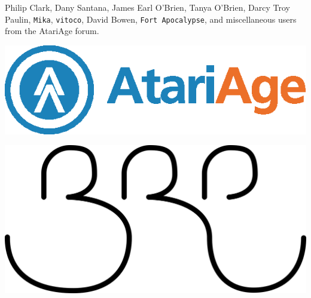 \documentclass[9pt,twocolumn,openany,article]{memoir}
\newcommand\englishskip{\vspace{14pt}}
\begin{document}
{ \footnotesize  Philip Clark, Dany  Santana, James Earl  O'Brien, Tanya
  O'Brien,  Darcy  Troy  Paulin, \texttt{Mika},  \texttt{vitoco},  David
  Bowen,  \texttt{Fort Apocalypse},  and  miscellaneous  users from  the
  AtariAge forum. }

\vfill

 \begin{center}
  \ifdefined\ATARIAGESAVE
  \includegraphics[width=.6667\columnwidth]{../Manual/AtariAgeHorizontalColor.eps}

  \englishskip

  \fi
  \includegraphics[width=.333\columnwidth]{../Manual/BRP.png}
\end{center}

\ifdefined\ATARIAGESAVE
\else

\clearpage
{}
\thispagestyle{empty}

\fi
\end{document}
